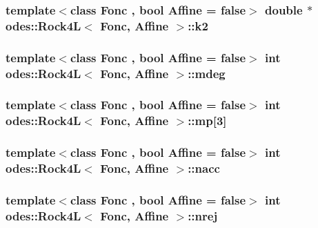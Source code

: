 \hypertarget{classodes_1_1Rock4L_a794fc4a942e72460fb8dbce83fe191d1}{
\subsubsection[{k2}]{\setlength{\rightskip}{0pt plus 5cm}template$<$class Fonc , bool Affine = false$>$ double $\ast$ {\bf odes\-::\-Rock4\-L}$<$ Fonc, Affine $>$\-::k2\hspace{0.3cm}{\ttfamily [private]}}}\label{classodes_1_1Rock4L_a794fc4a942e72460fb8dbce83fe191d1}
\hypertarget{classodes_1_1Rock4L_af7dc55d28288c0d21d8be9a21ec476a0}{
\subsubsection[{mdeg}]{\setlength{\rightskip}{0pt plus 5cm}template$<$class Fonc , bool Affine = false$>$ int {\bf odes\-::\-Rock4\-L}$<$ Fonc, Affine $>$\-::mdeg\hspace{0.3cm}{\ttfamily [private]}}}\label{classodes_1_1Rock4L_af7dc55d28288c0d21d8be9a21ec476a0}
\hypertarget{classodes_1_1Rock4L_a217bad32652adff95b084deea4b05d2e}{
\subsubsection[{mp}]{\setlength{\rightskip}{0pt plus 5cm}template$<$class Fonc , bool Affine = false$>$ int {\bf odes\-::\-Rock4\-L}$<$ Fonc, Affine $>$\-::mp\mbox{[}3\mbox{]}\hspace{0.3cm}{\ttfamily [private]}}}\label{classodes_1_1Rock4L_a217bad32652adff95b084deea4b05d2e}
\hypertarget{classodes_1_1Rock4L_a0e0c9fd49086ba6181b2bde34c7bf2fe}{
\subsubsection[{nacc}]{\setlength{\rightskip}{0pt plus 5cm}template$<$class Fonc , bool Affine = false$>$ int {\bf odes\-::\-Rock4\-L}$<$ Fonc, Affine $>$\-::nacc\hspace{0.3cm}{\ttfamily [private]}}}\label{classodes_1_1Rock4L_a0e0c9fd49086ba6181b2bde34c7bf2fe}
\hypertarget{classodes_1_1Rock4L_ae8fa91c260b0c33a22a806053f76d053}{
\subsubsection[{nrej}]{\setlength{\rightskip}{0pt plus 5cm}template$<$class Fonc , bool Affine = false$>$ int {\bf odes\-::\-Rock4\-L}$<$ Fonc, Affine $>$\-::nrej\hspace{0.3cm}{\ttfamily [private]}}}\label{classodes_1_1Rock4L_ae8fa91c260b0c33a22a806053f76d053}
